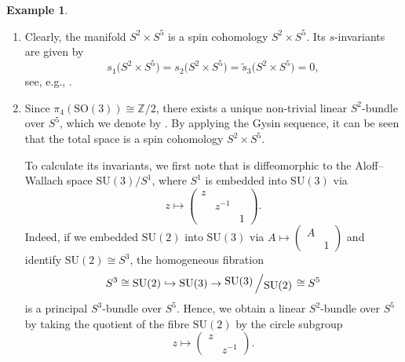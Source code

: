 \documentclass[10pt,a4paper]{amsart}
\numberwithin{equation}{section}
\theoremstyle{definition}
\newtheorem{Example}[Theorem]{Example}
\numberwithin{table}{section}
\newcommand{\Z}{\mathbb{Z}}
\newcommand{\bigslant}[2]{{\raisebox{.2em}{$#1$}\left/\raisebox{-.2em}{$#2$}\right.}}
\newcommand{\ttimes}{\mathrel{\widetilde{\times} }}
\begin{document}
\begin{Example}\label{EX:spin_cohom_S2xS5}\qquad
	\begin{enumerate}\itemsep=0pt
		\item[$(1)$] Clearly, the manifold $S^2\times S^5$ is a spin cohomology $S^2\times S^5$. Its $s$-invariants are given by
		\[ s_1\bigl(S^2\times S^5\bigr)=s_2\bigl(S^2\times S^5\bigr)=\tilde{s}_3\bigl(S^2\times S^5\bigr)=0, \]
		see, e.g., \cite[Lemma~4]{Xu25}.
		\item[$(2)$] Since $\pi_4(\mathrm{SO}(3))\cong\Z/2$, there exists a unique non-trivial linear $S^2$-bundle over $S^5$, which we denote by \smash{$S^5\ttimes S^2\to S^5$}. By applying the Gysin sequence, it can be seen that the total space \smash{$S^5\ttimes S^2$} is a spin cohomology $S^2\times S^5$.
		
		To calculate its invariants, we first note that \smash{$S^5\ttimes S^2$} is diffeomorphic to the Aloff--Wallach space $\mathrm{SU}(3)/S^1$, where $S^1$ is embedded into $\mathrm{SU}(3)$ via
		\[ z\mapsto\begin{pmatrix}
			z & & \\ & z^{-1} & \\ & & 1
		\end{pmatrix}. \]
		Indeed, if we embedded $\mathrm{SU}(2)$ into $\mathrm{SU}(3)$ via $A\mapsto \left(\begin{smallmatrix}
			A &\\ & 1
		\end{smallmatrix}\right)$ and identify $\mathrm{SU}(2)\cong S^3$, the homogeneous fibration
		\[ S^3\cong \mathrm{SU}(2)\hookrightarrow\mathrm{SU}(3)\to\bigslant{\mathrm{SU}(3)}{\mathrm{SU}(2)}\cong S^5 \]
		is a principal $S^3$-bundle over $S^5$. Hence, we obtain a linear $S^2$-bundle over $S^5$ by taking the quotient of the fibre $\mathrm{SU}(2)$ by the circle subgroup
		\[ z\mapsto  \begin{pmatrix}
			z &\\&z^{-1}
		\end{pmatrix}. \]
		

\end{enumerate}
\end{Example}
\end{document}
